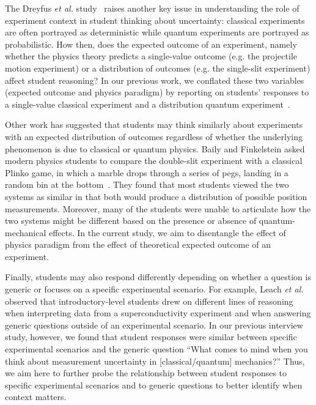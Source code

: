 \documentclass[english,aps,prstper,reprint,showpacs,longbibliography,superscriptaddress,nofootinbib]{revtex4-2}
\begin{document}
The Dreyfus \textit{et al.} study~\cite{Dreyfus2019} raises another key issue in understanding the role of experiment context in student thinking about uncertainty: classical experiments are often portrayed as deterministic while quantum experiments are portrayed as probabilistic. How then, does the expected outcome of an experiment, namely whether the physics theory predicts a single-value outcome (e.g. the projectile motion experiment) or a distribution of outcomes (e.g. the single-slit experiment) affect student reasoning? In our previous work, we conflated these two variables (expected outcome and physics paradigm) by reporting on students' responses to a single-value classical experiment and a distribution quantum experiment~\cite{Stein2019, Stump2020}.

Other work has suggested that students may think similarly about experiments with an expected distribution of outcomes regardless of whether the underlying phenomenon is due to classical or quantum physics. Baily and Finkelstein asked modern physics students to compare the double-slit experiment with a classical Plinko game, in which a marble drops through a series of pegs, landing in a random bin at the bottom~\cite{Baily2009a}. They found that most students viewed the two systems as similar in that both would produce a distribution of possible position measurements. Moreover, many of the students were unable to articulate how the two systems might be different based on the presence or absence of quantum-mechanical effects. In the current study, we aim to disentangle the effect of physics paradigm from the effect of theoretical expected outcome of an experiment.

Finally, students may also respond differently depending on whether a question is generic or focuses on a specific experimental scenario. For example, Leach \textit{et al.}~\cite{Leach2000} observed that introductory-level students drew on different lines of reasoning when interpreting data from a superconductivity experiment and when answering generic questions outside of an experimental scenario. In our previous interview study, however, we found that student responses were similar between specific experimental scenarios and the generic question ``What comes to mind when you think about measurement uncertainty in [classical/quantum] mechanics?'' Thus, we aim here to further probe the relationship between student responses to specific experimental scenarios and to generic questions to better identify when context matters.
\end{document}
